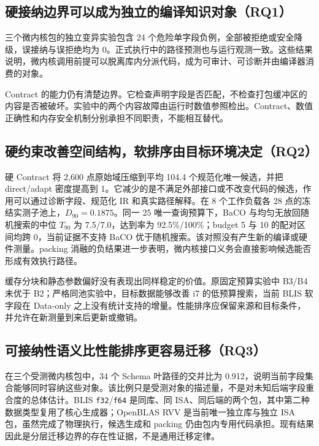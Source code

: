\subsection{硬接纳边界可以成为独立的编译知识对象（RQ1）}

三个微内核包的独立变异实验包含 24 个危险单字段负例，全部被拒绝或安全降级，误接纳与误拒绝均为 0。正式执行中的路径预测也与运行观测一致。这些结果说明，微内核调用前提可以脱离库内分派代码，成为可审计、可诊断并由编译器消费的对象。

Contract 的能力仍有清楚边界。它检查声明字段是否匹配，不检查打包缓冲区的内容是否被破坏。实验中的两个内容故障由运行时数值参照检出。Contract、数值正确性和内存安全机制分别承担不同职责，不能相互替代。

\subsection{硬约束改善空间结构，软排序由目标环境决定（RQ2）}

硬 Contract 将 2,600 点原始域压缩到平均 104.4 个规范化唯一候选，并把 direct/adapt 密度提高到 1。它减少的是不满足外部接口或不改变代码的候选，作用可以通过诊断字段、规范化 IR 和真实路径解释。在 8 个工作负载各 28 点的冻结实测子池上，$D_{90}=0.1875$。同一 25 唯一查询预算下，BaCO 与均匀无放回随机搜索的中位 $T_{90}$ 为 7.5/7.0，达到率为 92.5\%/100\%；budget 5 与 10 的配对区间均跨 0，当前证据不支持 BaCO 优于随机搜索。该对照没有产生新的编译或硬件测量。packing 消融的负结果进一步表明，微内核接口义务会直接影响候选能否形成有效执行路径。

缓存分块和静态参数偏好没有表现出同样稳定的价值。原固定预算实验中 B3/B4 未优于 B2；严格同池实验中，目标数据能够改善 i7 的低预算搜索，当前 BLIS 软字段在 Data-only 之上没有统计支持的增量。性能排序应保留来源和目标条件，并允许在新测量到来后更新或撤销。

\subsection{可接纳性语义比性能排序更容易迁移（RQ3）}

在三个受测微内核包中，34 个 Schema 叶路径的交并比为 0.912，说明当前字段集合能够同时容纳这些对象。该比例只是受测对象的描述量，不是对未知后端字段重合度的总体估计。BLIS \texttt{f32}/\texttt{f64} 是同库、同 ISA、同后端的两个包，其中第二种数据类型复用了核心生成器；OpenBLAS RVV 是当前唯一独立库与独立 ISA 包，虽然完成了物理执行，候选生成和 packing 仍由包内专用代码承担。现有结果因此是分层迁移边界的存在性证据，不是通用迁移定律。

